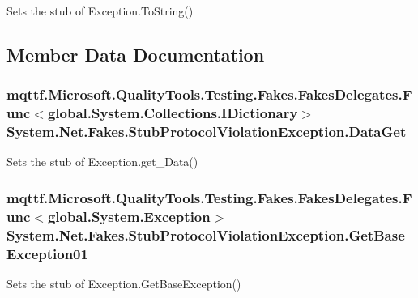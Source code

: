 Sets the stub of Exception.\-To\-String()



\subsection{Member Data Documentation}
\hypertarget{class_system_1_1_net_1_1_fakes_1_1_stub_protocol_violation_exception_a6fa5e0fd5db4fed4a95d3ec3e8975ce2}{
\subsubsection[{Data\-Get}]{\setlength{\rightskip}{0pt plus 5cm}mqttf.\-Microsoft.\-Quality\-Tools.\-Testing.\-Fakes.\-Fakes\-Delegates.\-Func$<$global.\-System.\-Collections.\-I\-Dictionary$>$ System.\-Net.\-Fakes.\-Stub\-Protocol\-Violation\-Exception.\-Data\-Get}}\label{class_system_1_1_net_1_1_fakes_1_1_stub_protocol_violation_exception_a6fa5e0fd5db4fed4a95d3ec3e8975ce2}


Sets the stub of Exception.\-get\-\_\-\-Data()

\hypertarget{class_system_1_1_net_1_1_fakes_1_1_stub_protocol_violation_exception_af5a0c1d5f7b8e5d9cc0eddb06f1c049a}{
\subsubsection[{Get\-Base\-Exception01}]{\setlength{\rightskip}{0pt plus 5cm}mqttf.\-Microsoft.\-Quality\-Tools.\-Testing.\-Fakes.\-Fakes\-Delegates.\-Func$<$global.\-System.\-Exception$>$ System.\-Net.\-Fakes.\-Stub\-Protocol\-Violation\-Exception.\-Get\-Base\-Exception01}}\label{class_system_1_1_net_1_1_fakes_1_1_stub_protocol_violation_exception_af5a0c1d5f7b8e5d9cc0eddb06f1c049a}


Sets the stub of Exception.\-Get\-Base\-Exception()

